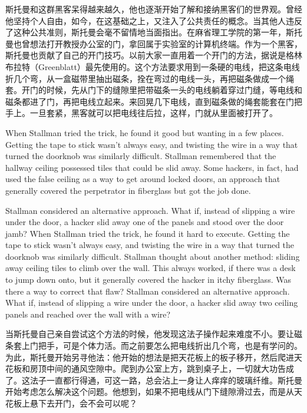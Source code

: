 \ifdefined\chs
斯托曼和这群黑客呆得越来越久，他也逐渐开始了解和接纳黑客们的世界观。曾经他坚持个人自由，如今，在这基础之上，又注入了公共责任的概念。当其他人违反了这种公共准则，斯托曼会毫不留情地当面指出。在麻省理工学院的第一年，斯托曼也曾想法打开教授办公室的门，拿回属于实验室的计算机终端。作为一个黑客，斯托曼也贡献了自己的开门技巧。以前大家一直用着一个开门的方法，据说是格林布拉特（Greenblatt）最先使用的。这个方法要求用到一条硬的电线，把这条电线折几个弯，从一盒磁带里抽出磁条，拴在弯过的电线一头，再把磁条做成一个绳套。开门的时候，先从门下的缝隙里把带磁条一头的电线躺着穿过门缝，等电线和磁条都进了门，再把电线立起来。来回晃几下电线，直到磁条做的绳套能套在门把手上。一旦套紧，黑客就可以把电线往后拉，这样，门就从里面被打开了。
\fi

\ifdefined\eng
\ifdefined\vone
When Stallman tried the trick, he found it good but wanting in a few places. Getting the tape to stick wasn't always easy, and twisting the wire in a way that turned the doorknob was similarly difficult. Stallman remembered that the hallway ceiling possessed tiles that could be slid away. Some hackers, in fact, had used the false ceiling as a way to get around locked doors, an approach that generally covered the perpetrator in fiberglass but got the job done.

Stallman considered an alternative approach. What if, instead of slipping a wire under the door, a hacker slid away one of the panels and stood over the door jamb?
\fi
\ifdefined\vtwo
When Stallman tried the trick, he found it hard to execute. Getting the tape to stick wasn't always easy, and twisting the wire in a way that turned the doorknob was similarly difficult. Stallman thought about another method: sliding away ceiling tiles to climb over the wall. This always worked, if there was a desk to jump down onto, but it generally covered the hacker in itchy fiberglass.  Was there a way to correct that flaw? Stallman considered an alternative approach. What if, instead of slipping a wire under the door, a hacker slid away two ceiling panels and reached over the wall with a wire?
\fi
\fi

\ifdefined\chs
当斯托曼自己亲自尝试这个方法的时候，他发现这法子操作起来难度不小。要让磁条套上门把手，可是个体力活。而之前要怎么把电线折出几个弯，也是有学问的。为此，斯托曼开始另寻他法：他开始的想法是把天花板上的板子移开，然后爬进天花板和房顶中间的通风空隙中。爬到办公室上方，跳到桌子上，一切就大功告成了。这法子一直都行得通，可这一路，总会沾上一身让人痒痒的玻璃纤维。斯托曼开始考虑怎么解决这个问题。他想到，如果不把电线从门下缝隙滑过去，而是从天花板上悬下去开门，会不会可以呢？
\fi

